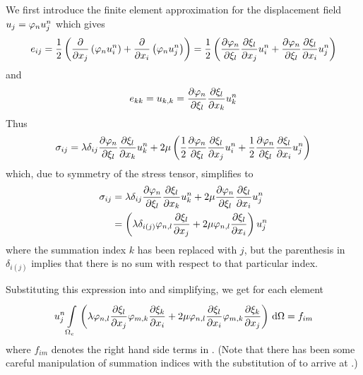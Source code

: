 We first introduce the finite element approximation for the displacement field
$u_{j}=\lbfnsymb{n}u_{j}^{n}$ which gives
\begin{equation}
  e_{ij} = \frac{1}{2}\pbrac{\hdelby{\lbfnsymb{n}u_{i}^{n}}{x_{j}} +
  \hdelby{\lbfnsymb{n}u_{j}^{n}}{x_{i}}} =
  \frac{1}{2}\pbrac{\delby{\lbfnsymb{n}}{\xi_{l}}\delby{\xi_{l}}{x_{j}}u_{i}^{n}
  + \delby{\lbfnsymb{n}}{\xi_{l}}\delby{\xi_{l}}{x_{i}}u_{j}^{n}}
\end{equation}
and
\begin{equation*}
  e_{kk} = u_{k,k} = \delby{\lbfnsymb{n}}{\xi_{l}}\delby{\xi_{l}}{x_{k}}u_{k}^{n}
\end{equation*}
Thus
\begin{equation*}
  \sigma_{ij} = \lambda \delta_{ij}
  \delby{\lbfnsymb{n}}{\xi_{l}}\delby{\xi_{l}}{x_{k}}u_{k}^{n} + 2\mu \pbrac{
  \frac{1}{2}\delby{\lbfnsymb{n}}{\xi_{l}}\delby{\xi_{l}}{x_{j}}u_{i}^{n} +
  \frac{1}{2}\delby{\lbfnsymb{n}}{\xi_{l}}\delby{\xi_{l}}{x_{i}}u_{j}^{n}}
\end{equation*}
which, due to symmetry of the stress tensor, simplifies to
\begin{align}
  \sigma_{ij} &= \lambda \delta_{ij}
  \delby{\lbfnsymb{n}}{\xi_{l}}\delby{\xi_{l}}{x_{k}}u_{k}^{n} + 2\mu 
  \delby{\lbfnsymb{n}}{\xi_{l}}\delby{\xi_{l}}{x_{i}}u_{j}^{n} \nonumber \\
              &= \pbrac{\lambda \delta_{i(j)}
  \lbfnsymb{n,l}\delby{\xi_{l}}{x_{j}} + 2\mu 
  \lbfnsymb{n,l}\delby{\xi_{l}}{x_{i}}}u_{j}^{n}
  \label{eqn:stresscmpts}
\end{align}
where the summation index $k$ has been replaced with $j$, but the parenthesis
in $\delta_{i(j)}$ implies that there is no sum with respect to that
particular index.

Substituting this expression into  and simplifying, we
get for each element
\begin{equation}
    u_{j}^{n} \gint{\Omega_{e}}{}{\pbrac{ \lambda
       \lbfnsymb{n,l}\delby{\xi_{l}}{x_{j}}
       \lbfnsymb{m,k}\delby{\xi_{k}}{x_{i}} + 2\mu
       \lbfnsymb{n,l}\delby{\xi_{l}}{x_{i}}
       \lbfnsymb{m,k}\delby{\xi_{k}}{x_{j}}}}{\Omega} = f_{im}
  \label{eqn:linelasfem}
\end{equation}
where $f_{im}$ denotes the right hand side terms in
. (Note that there has been some careful manipulation
of summation indices with the substitution of  to
arrive at .)

